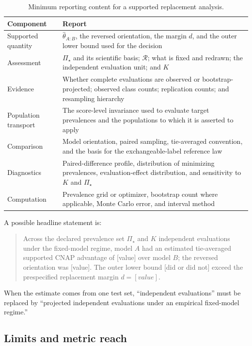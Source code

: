 \documentclass[11pt]{article}
\newcommand{\Regime}{\mathcal{R}}
\newcommand{\PSet}{\Pi_\star}
\theoremstyle{remark}
\begin{document}
\begin{table}[ht]
\centering
\caption{Minimum reporting content for a supported replacement analysis.}
\label{tab:reporting}
\begin{tabularx}{\textwidth}{@{}p{}X@{}}
\toprule
Component & Report \\
\midrule
Supported quantity &
$\widehat\theta_{A:B}$, the reversed orientation, the margin $d$, and the outer lower bound used for the decision \\
Assessment &
$\PSet$ and its scientific basis; $\Regime$; what is fixed and redrawn; the independent evaluation unit; and $K$ \\
Evidence &
Whether complete evaluations are observed or bootstrap-projected; observed class counts; replication counts; and resampling hierarchy \\
Population transport &
The score-level invariance used to evaluate target prevalences and the populations to which it is asserted to apply \\
Comparison &
Model orientation, paired sampling, tie-averaged convention, and the basis for the exchangeable-label reference law \\
Diagnostics &
Paired-difference profile, distribution of minimizing prevalences, evaluation-effect distribution, and sensitivity to $K$ and $\PSet$ \\
Computation &
Prevalence grid or optimizer, bootstrap count where applicable, Monte Carlo error, and interval method \\
\bottomrule
\end{tabularx}
\end{table}

A possible headline statement is:
\begin{quote}
Across the declared prevalence set $\PSet$ and $K$ independent evaluations under the fixed-model regime, model $A$ had an estimated tie-averaged supported CNAP advantage of [value] over model $B$; the reversed orientation was [value]. The outer lower bound [did or did not] exceed the prespecified replacement margin $d=[value].$
\end{quote}
When the estimate comes from one test set, ``independent evaluations'' must be replaced by ``projected independent evaluations under an empirical fixed-model regime.''

\subsection{Limits and metric reach}
\end{document}
